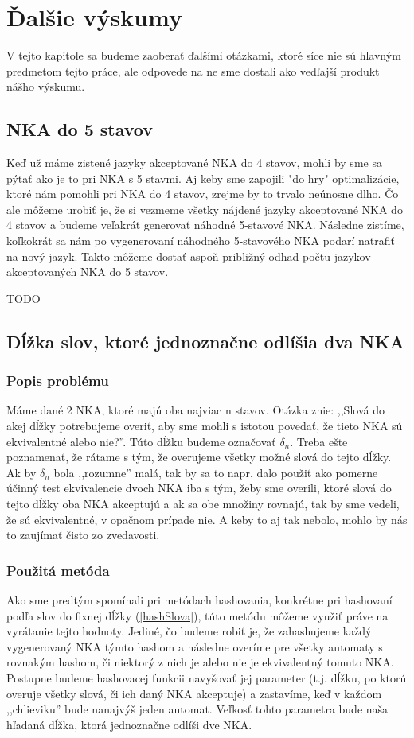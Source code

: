 \chapter{Ďalšie výskumy}

V tejto kapitole sa budeme zaoberať ďalšími otázkami, ktoré síce nie sú hlavným predmetom tejto práce, ale odpovede na ne sme dostali ako vedľajší produkt nášho výskumu.

\section{NKA do 5 stavov}
Keď už máme zistené jazyky akceptované NKA do 4 stavov, mohli by sme sa pýtať ako je to pri NKA s 5 stavmi. Aj keby sme zapojili "do hry" optimalizácie, ktoré nám pomohli pri NKA do 4 stavov, zrejme by to trvalo neúnosne dlho. Čo ale môžeme urobiť je, že si vezmeme všetky nájdené jazyky akceptované NKA do 4 stavov a budeme veľakrát generovať náhodné 5-stavové NKA. Následne zistíme, koľkokrát sa nám po vygenerovaní náhodného 5-stavového NKA podarí natrafiť na nový jazyk. Takto môžeme dostať aspoň približný odhad počtu jazykov akceptovaných NKA do 5 stavov.

TODO
\label{safeWordLength}
\section{Dĺžka slov, ktoré jednoznačne odlíšia dva NKA}


\subsection{Popis problému}
Máme dané 2 NKA, ktoré majú oba najviac n stavov. Otázka znie: ,,Slová do akej dĺžky potrebujeme overiť, aby sme mohli s istotou povedať, že tieto NKA sú ekvivalentné alebo nie?''. Túto dĺžku budeme označovať $\delta_n$. Treba ešte poznamenať, že rátame s tým, že overujeme všetky možné slová do tejto dĺžky.  Ak by $\delta_n$ bola ,,rozumne'' malá, tak by sa to napr. dalo použiť ako pomerne účinný test ekvivalencie dvoch NKA iba s tým, žeby sme overili, ktoré slová do tejto dĺžky oba NKA akceptujú a ak sa obe množiny rovnajú, tak by sme vedeli, že sú ekvivalentné, v opačnom prípade nie. A keby to aj tak nebolo, mohlo by nás to zaujímať čisto zo zvedavosti. 

\subsection{Použitá metóda}
Ako sme predtým spomínali pri metódach hashovania, konkrétne pri hashovaní podľa slov do fixnej dĺžky (\ref{hashSlova}), túto metódu môžeme využiť práve na vyrátanie tejto hodnoty. Jediné, čo budeme robiť je, že zahashujeme každý vygenerovaný NKA týmto hashom a následne overíme pre všetky automaty s rovnakým hashom, či niektorý z nich je alebo nie je ekvivalentný tomuto NKA. Postupne budeme hashovacej funkcii navyšovať jej parameter (t.j. dĺžku, po ktorú overuje všetky slová, či ich daný NKA akceptuje) a zastavíme, keď v každom ,,chlieviku'' bude nanajvýš jeden automat. Veľkosť tohto parametra bude naša hľadaná dĺžka, ktorá jednoznačne odlíši dve NKA.

